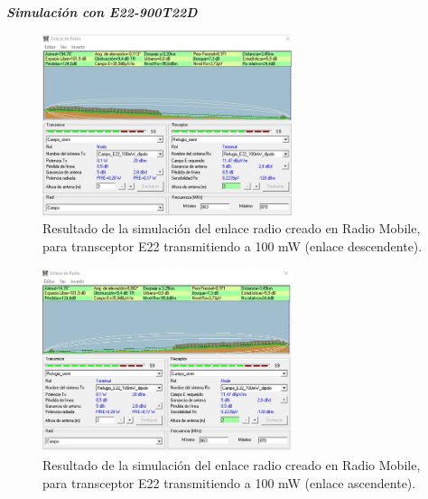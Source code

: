 \documentclass[12pt]{article}
\begin{document}
	\noindent \textit{\textbf{Simulación con E22-900T22D}} \\
	
	\begin{figure}[h!]
		\begin{center}
			\includegraphics[width=0.65\textwidth]{img/resultado_e22_100mW_desc.png}
			\caption{Resultado de la simulación del enlace radio creado en Radio Mobile, para transceptor E22 transmitiendo a 100 mW (enlace descendente).}
			\label{fig: resultado enlace e22 100mW descendente radio mobile}
		\end{center}
	\end{figure}
	
	
	
	\begin{figure}[h!]
		\begin{center}
			\includegraphics[width=0.65\textwidth]{img/resultado_e22_100mW_asc.png}
			\caption{Resultado de la simulación del enlace radio creado en Radio Mobile, para transceptor E22 transmitiendo a 100 mW (enlace ascendente).}
			\label{fig: resultado enlace e22 100mW ascendente radio mobile}
		\end{center}
	\end{figure} 
	
\end{document}
